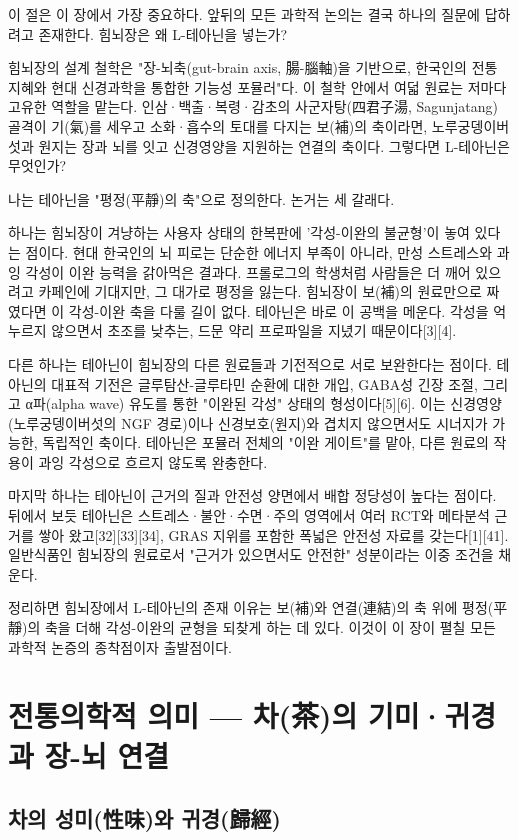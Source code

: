\documentclass[12pt,oneside]{book}
\begin{document}
이 절은 이 장에서 가장 중요하다. 앞뒤의 모든 과학적 논의는 결국 하나의 질문에 답하려고 존재한다. 힘뇌장은 왜 L-테아닌을 넣는가?

힘뇌장의 설계 철학은 "장-뇌축(gut-brain axis, 腸-腦軸)을 기반으로, 한국인의 전통 지혜와 현대 신경과학을 통합한 기능성 포뮬러"다. 이 철학 안에서 여덟 원료는 저마다 고유한 역할을 맡는다. 인삼·백출·복령·감초의 사군자탕(四君子湯, Sagunjatang) 골격이 기(氣)를 세우고 소화·흡수의 토대를 다지는 보(補)의 축이라면, 노루궁뎅이버섯과 원지는 장과 뇌를 잇고 신경영양을 지원하는 연결의 축이다. 그렇다면 L-테아닌은 무엇인가?

나는 테아닌을 "평정(平靜)의 축"으로 정의한다. 논거는 세 갈래다.

하나는 힘뇌장이 겨냥하는 사용자 상태의 한복판에 '각성-이완의 불균형'이 놓여 있다는 점이다. 현대 한국인의 뇌 피로는 단순한 에너지 부족이 아니라, 만성 스트레스와 과잉 각성이 이완 능력을 갉아먹은 결과다. 프롤로그의 학생처럼 사람들은 더 깨어 있으려고 카페인에 기대지만, 그 대가로 평정을 잃는다. 힘뇌장이 보(補)의 원료만으로 짜였다면 이 각성-이완 축을 다룰 길이 없다. 테아닌은 바로 이 공백을 메운다. 각성을 억누르지 않으면서 초조를 낮추는, 드문 약리 프로파일을 지녔기 때문이다[3][4].

다른 하나는 테아닌이 힘뇌장의 다른 원료들과 기전적으로 서로 보완한다는 점이다. 테아닌의 대표적 기전은 글루탐산-글루타민 순환에 대한 개입, GABA성 긴장 조절, 그리고 α파(alpha wave) 유도를 통한 "이완된 각성" 상태의 형성이다[5][6]. 이는 신경영양(노루궁뎅이버섯의 NGF 경로)이나 신경보호(원지)와 겹치지 않으면서도 시너지가 가능한, 독립적인 축이다. 테아닌은 포뮬러 전체의 "이완 게이트"를 맡아, 다른 원료의 작용이 과잉 각성으로 흐르지 않도록 완충한다.

마지막 하나는 테아닌이 근거의 질과 안전성 양면에서 배합 정당성이 높다는 점이다. 뒤에서 보듯 테아닌은 스트레스·불안·수면·주의 영역에서 여러 RCT와 메타분석 근거를 쌓아 왔고[32][33][34], GRAS 지위를 포함한 폭넓은 안전성 자료를 갖는다[1][41]. 일반식품인 힘뇌장의 원료로서 "근거가 있으면서도 안전한" 성분이라는 이중 조건을 채운다.

정리하면 힘뇌장에서 L-테아닌의 존재 이유는 보(補)와 연결(連結)의 축 위에 평정(平靜)의 축을 더해 각성-이완의 균형을 되찾게 하는 데 있다. 이것이 이 장이 펼칠 모든 과학적 논증의 종착점이자 출발점이다.

\section{전통의학적 의미 — 차(茶)의 기미·귀경과 장-뇌 연결}

\subsection{차의 성미(性味)와 귀경(歸經)}
\end{document}
